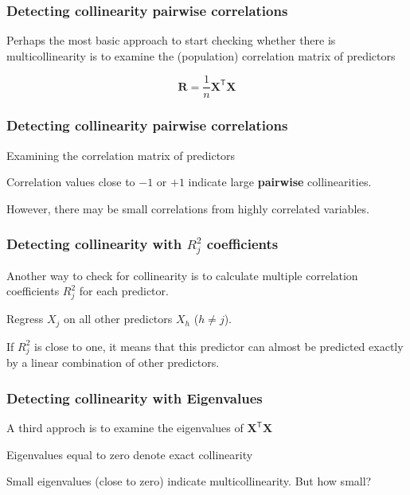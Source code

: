 \documentclass[12pt]{beamer}\usepackage[]{graphicx}\usepackage[]{color}
\begin{document}

\begin{frame}
\frametitle{Detecting collinearity pairwise correlations}

Perhaps the most basic approach to start checking whether there is multicollinearity
is to examine the (population) correlation matrix of predictors

{\Large
$$
\mathbf{R} = \frac{1}{n} \mathbf{X^\mathsf{T} X}
$$
}

\end{frame}


\begin{frame}
\frametitle{Detecting collinearity pairwise correlations}

\bbi
  \item Examining the correlation matrix of predictors
  \item Correlation values close to $-1$ or $+1$ indicate large 
  \textbf{pairwise} collinearities.
  \item However, there may be small correlations from highly correlated variables.
\ei
\eb

\end{frame}


\begin{frame}
\frametitle{Detecting collinearity with $R_{j}^{2}$ coefficients}

\bbi
  \item Another way to check for collinearity is to calculate multiple correlation 
  coefficients $R_{j}^{2}$ for each predictor.
  \item Regress $X_j$ on all other predictors $X_h$ ($h \neq j$).
  \item If $R_{j}^{2}$ is close to one, it means that this predictor can almost be predicted
  exactly by a linear combination of other predictors.
\ei
\eb

\end{frame}


\begin{frame}
\frametitle{Detecting collinearity with Eigenvalues}

\bbi
  \item A third approch is to examine the eigenvalues of $\mathbf{X^\mathsf{T} X}$
  \item Eigenvalues equal to zero denote exact collinearity
  \item Small eigenvalues (close to zero) indicate multicollinearity. But how small?
\ei
\eb

\end{frame}
\end{document}
